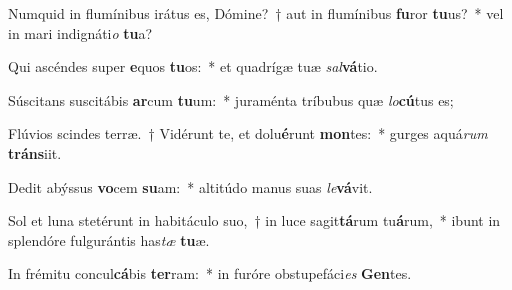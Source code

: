\item Numquid in flumínibus irátus es, Dómine?~† aut in flumínibus \textbf{fu}ror \textbf{tu}us?~* vel in mari indignáti\textit{o} \textbf{tu}a?
\item Qui ascéndes super \textbf{e}quos \textbf{tu}os:~* et quadrígæ tuæ \textit{sal}\textbf{vá}tio.
\item Súscitans suscitábis \textbf{ar}cum \textbf{tu}um:~* juraménta tríbubus quæ \textit{lo}\textbf{cú}tus es;
\item Flúvios scindes terræ.~† Vidérunt te, et dolu\textbf{é}runt \textbf{mon}tes:~* gurges aquá\textit{rum} \textbf{tráns}iit.
\item Dedit abýssus \textbf{vo}cem \textbf{su}am:~* altitúdo manus suas \textit{le}\textbf{vá}vit.
\item Sol et luna stetérunt in habitáculo suo,~† in luce sagit\textbf{tá}rum tu\textbf{á}rum,~* ibunt in splendóre fulgurántis has\textit{tæ} \textbf{tu}æ.
\item In frémitu concul\textbf{cá}bis \textbf{ter}ram:~* in furóre obstupefáci\textit{es} \textbf{Gen}tes.
